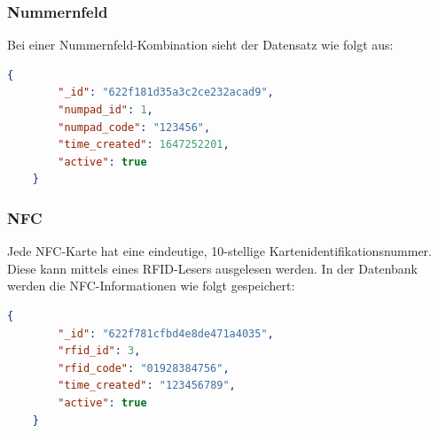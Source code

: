 \subsubsection{Nummernfeld}
Bei einer Nummernfeld-Kombination sieht der Datensatz wie folgt aus:
\begin{lstlisting}[language=JSON, caption=Aufbau einer Nummernfeld-Kombination in der Datenbank, label=lst:lsg:numpad]
    {
        "_id": "622f181d35a3c2ce232acad9",
        "numpad_id": 1,
        "numpad_code": "123456",
        "time_created": 1647252201,
        "active": true
    }
\end{lstlisting}

\subsubsection{NFC}
Jede NFC-Karte hat eine eindeutige, 10-stellige Kartenidentifikationsnummer. Diese kann mittels eines RFID-Lesers ausgelesen werden. In der Datenbank werden die NFC-Informationen wie folgt gespeichert:
\begin{lstlisting}[language=JSON, caption=Aufbau einer NFC-Karte in der Datenbank, label=lst:lsg:nfc]
    {
        "_id": "622f781cfbd4e8de471a4035",
        "rfid_id": 3,
        "rfid_code": "01928384756",
        "time_created": "123456789",
        "active": true
    }
    \end{lstlisting}